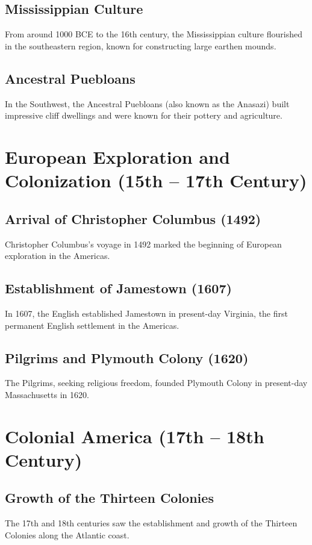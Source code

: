 \documentclass{book}
\begin{document}
\subsection{Mississippian Culture}
\label{subsec:mississippian-culture}
From around 1000 BCE to the 16th century, the Mississippian culture flourished in the southeastern region, known for constructing large earthen mounds.

\subsection{Ancestral Puebloans}
\label{subsec:ancestral-puebloans}
In the Southwest, the Ancestral Puebloans (also known as the Anasazi) built impressive cliff dwellings and were known for their pottery and agriculture.

\section{European Exploration and Colonization (15th – 17th Century)}
\label{sec:european-exploration-colonization}
\subsection{Arrival of Christopher Columbus (1492)}
\label{subsec:arrival-christopher-columbus}
Christopher Columbus's voyage in 1492 marked the beginning of European exploration in the Americas.

\subsection{Establishment of Jamestown (1607)}
\label{subsec:establishment-jamestown}
In 1607, the English established Jamestown in present-day Virginia, the first permanent English settlement in the Americas.

\subsection{Pilgrims and Plymouth Colony (1620)}
\label{subsec:pilgrims-plymouth-colony}
The Pilgrims, seeking religious freedom, founded Plymouth Colony in present-day Massachusetts in 1620.

\section{Colonial America (17th – 18th Century)}
\label{sec:colonial-america}
\subsection{Growth of the Thirteen Colonies}
\label{subsec:growth-thirteen-colonies}
The 17th and 18th centuries saw the establishment and growth of the Thirteen Colonies along the Atlantic coast.
\end{document}
